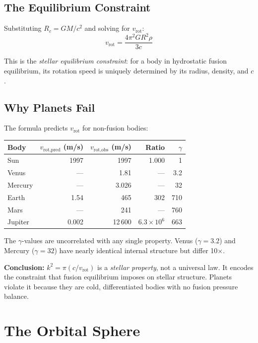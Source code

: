 \subsection{The Equilibrium Constraint}

Substituting $R_c = GM/c^2$ and solving for $v_{\text{rot}}$:
\begin{equation}
  v_{\text{rot}} = \frac{4\pi^2 G R^2 \rho}{3c}
\end{equation}

This is the \emph{stellar equilibrium constraint}: for a body in hydrostatic fusion equilibrium, its rotation speed is uniquely determined by its radius, density, and $c$.

\subsection{Why Planets Fail}

The formula predicts $v_{\text{rot}}$ for non-fusion bodies:
\begin{center}
\begin{tabular}{lrrrr}
\hline
\textbf{Body} & $v_{\text{rot,pred}}$ (m/s) & $v_{\text{rot,obs}}$ (m/s) & Ratio & $\gamma$ \\
\hline
Sun     & 1997   & 1997    & 1.000  & 1 \\
Venus   & ---    & 1.81    & ---    & 3.2 \\
Mercury & ---    & 3.026   & ---    & 32 \\
Earth   & 1.54   & 465     & 302    & 710 \\
Mars    & ---    & 241     & ---    & 760 \\
Jupiter & 0.002  & 12\,600 & $6.3 \times 10^6$ & 663 \\
\hline
\end{tabular}
\end{center}

The $\gamma$-values are uncorrelated with any single property.  Venus ($\gamma = 3.2$) and Mercury ($\gamma = 32$) have nearly identical internal structure but differ 10$\times$.

\textbf{Conclusion:} $k^2 = \pi(c/v_{\text{rot}})$ is a \emph{stellar property}, not a universal law.  It encodes the constraint that fusion equilibrium imposes on stellar structure.  Planets violate it because they are cold, differentiated bodies with no fusion pressure balance.


\section{The Orbital Sphere}

